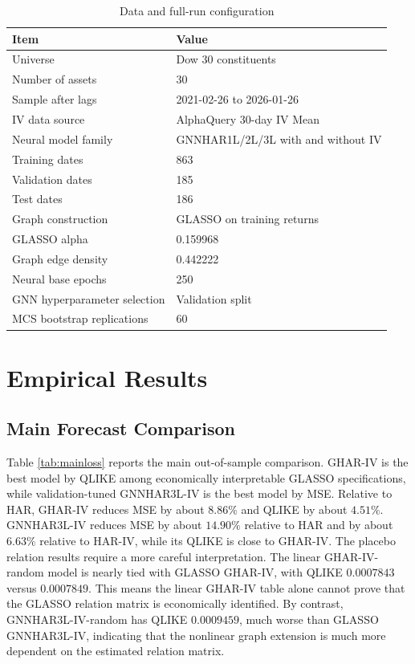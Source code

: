 \documentclass[11pt,a4paper]{article}
\begin{document}
\begin{table}[t]
\centering
\caption{Data and full-run configuration}
\label{tab:data}
\begin{tabular}{ll}
\toprule
Item & Value \\
\midrule
Universe & Dow 30 constituents \\
Number of assets & 30 \\
Sample after lags & 2021-02-26 to 2026-01-26 \\
IV data source & AlphaQuery 30-day IV Mean \\
Neural model family & GNNHAR1L/2L/3L with and without IV \\
Training dates & 863 \\
Validation dates & 185 \\
Test dates & 186 \\
Graph construction & GLASSO on training returns \\
GLASSO alpha & 0.159968 \\
Graph edge density & 0.442222 \\
Neural base epochs & 250 \\
GNN hyperparameter selection & Validation split \\
MCS bootstrap replications & 60 \\
\bottomrule
\end{tabular}
\end{table}

\section{Empirical Results}

\subsection{Main Forecast Comparison}

Table \ref{tab:mainloss} reports the main out-of-sample comparison. GHAR-IV is the best model
by QLIKE among economically interpretable GLASSO specifications, while validation-tuned
GNNHAR3L-IV is the best model by MSE. Relative to HAR, GHAR-IV reduces MSE by about
\(8.86\%\) and QLIKE by about \(4.51\%\). GNNHAR3L-IV reduces MSE by about
\(14.90\%\) relative to HAR and by about \(6.63\%\) relative to HAR-IV, while its QLIKE is
close to GHAR-IV. The placebo relation results require a more careful interpretation. The
linear GHAR-IV-random model is nearly tied with GLASSO GHAR-IV, with QLIKE
\(0.0007843\) versus \(0.0007849\). This means the linear GHAR-IV table alone cannot prove
that the GLASSO relation matrix is economically identified. By contrast, GNNHAR3L-IV-random
has QLIKE \(0.0009459\), much worse than GLASSO GNNHAR3L-IV, indicating that the nonlinear
graph extension is much more dependent on the estimated relation matrix.
\end{document}
